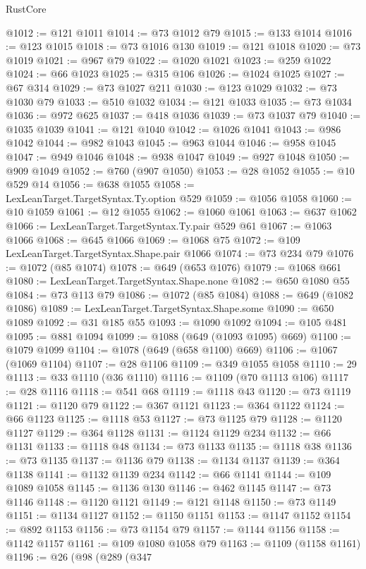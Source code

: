 \begin{lexlean}{RustCore}
\begin{coremodule}
@1012 := @121 @1011
@1014 := @73 @1012 @79
@1015 := @133 @1014
@1016 := @123 @1015
@1018 := @73 @1016 @130
@1019 := @121 @1018
@1020 := @73 @1019
@1021 := @967 @79
@1022 := @1020 @1021
@1023 := @259 @1022
@1024 := @66 @1023
@1025 := @315 @106
@1026 := @1024 @1025
@1027 := @67 @314
@1029 := @73 @1027 @211
@1030 := @123 @1029
@1032 := @73 @1030 @79
@1033 := @510 @1032
@1034 := @121 @1033
@1035 := @73 @1034
@1036 := @972 @625
@1037 := @418 @1036
@1039 := @73 @1037 @79
@1040 := @1035 @1039
@1041 := @121 @1040
@1042 := @1026 @1041
@1043 := @986 @1042
@1044 := @982 @1043
@1045 := @963 @1044
@1046 := @958 @1045
@1047 := @949 @1046
@1048 := @938 @1047
@1049 := @927 @1048
@1050 := @909 @1049
@1052 := @760 (@907 @1050)
@1053 := @28 @1052
@1055 := @10 @529 @14
@1056 := @638 @1055
@1058 := LexLeanTarget.TargetSyntax.Ty.option @529
@1059 := @1056 @1058
@1060 := @10 @1059
@1061 := @12 @1055
@1062 := @1060 @1061
@1063 := @637 @1062
@1066 := LexLeanTarget.TargetSyntax.Ty.pair @529 @61
@1067 := @1063 @1066
@1068 := @645 @1066
@1069 := @1068 @75
@1072 := @109 LexLeanTarget.TargetSyntax.Shape.pair @1066
@1074 := @73 @234 @79
@1076 := @1072 (@85 @1074)
@1078 := @649 (@653 @1076)
@1079 := @1068 @661
@1080 := LexLeanTarget.TargetSyntax.Shape.none
@1082 := @650 @1080 @55
@1084 := @73 @113 @79
@1086 := @1072 (@85 @1084)
@1088 := @649 (@1082 @1086)
@1089 := LexLeanTarget.TargetSyntax.Shape.some
@1090 := @650 @1089
@1092 := @31 @185 @55
@1093 := @1090 @1092
@1094 := @105 @481
@1095 := @881 @1094
@1099 := @1088 (@649 (@1093 @1095) @669)
@1100 := @1079 @1099
@1104 := @1078 (@649 (@658 @1100) @669)
@1106 := @1067 (@1069 @1104)
@1107 := @28 @1106
@1109 := @349 @1055 @1058
@1110 := 29
@1113 := @33 @1110 (@36 @1110)
@1116 := @1109 (@70 @1113 @106)
@1117 := @28 @1116
@1118 := @541 @68
@1119 := @1118 @43
@1120 := @73 @1119
@1121 := @1120 @79
@1122 := @367 @1121
@1123 := @364 @1122
@1124 := @66 @1123
@1125 := @1118 @53
@1127 := @73 @1125 @79
@1128 := @1120 @1127
@1129 := @364 @1128
@1131 := @1124 @1129 @234
@1132 := @66 @1131
@1133 := @1118 @48
@1134 := @73 @1133
@1135 := @1118 @38
@1136 := @73 @1135
@1137 := @1136 @79
@1138 := @1134 @1137
@1139 := @364 @1138
@1141 := @1132 @1139 @234
@1142 := @66 @1141
@1144 := @109 @1089 @1058
@1145 := @1136 @130
@1146 := @462 @1145
@1147 := @73 @1146
@1148 := @1120 @1121
@1149 := @121 @1148
@1150 := @73 @1149
@1151 := @1134 @1127
@1152 := @1150 @1151
@1153 := @1147 @1152
@1154 := @892 @1153
@1156 := @73 @1154 @79
@1157 := @1144 @1156
@1158 := @1142 @1157
@1161 := @109 @1080 @1058 @79
@1163 := @1109 (@1158 @1161)
@1196 := @26
    (@98
      (@289
        (@347

\end{coremodule}
\end{lexlean}
